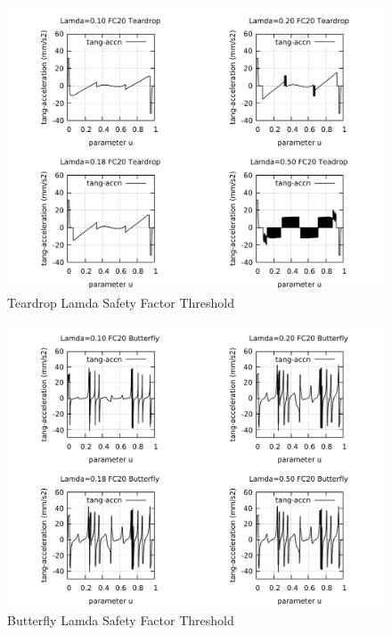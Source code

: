 \clearpage
\pagebreak
\begin{landscape}
	\begin{figure}
		\centering
		\caption  {Teardrop Lamda Safety Factor Threshold}
		\label{img-Teardrop Lamda Safety Factor Threshold}
		\includegraphics[width=1.30\textwidth]{Chap4/Lamda/img-4plots-TEARDROP-Lamda-010-018-020-050-FC20-Tang-Accn.pdf} 
	\end{figure}
\end{landscape}

\clearpage
\pagebreak
\begin{landscape}
	\begin{figure}
		\centering
		\caption  {Butterfly Lamda Safety Factor Threshold}
		\label{img-Butterfly Lamda Safety Factor Threshold}
		\includegraphics[width=1.30\textwidth]{Chap4/Lamda/img-4plots-BUTTERFLY-Lamda-010-018-020-050-FC20-Tang-Accn.pdf} 
	\end{figure}
\end{landscape}

